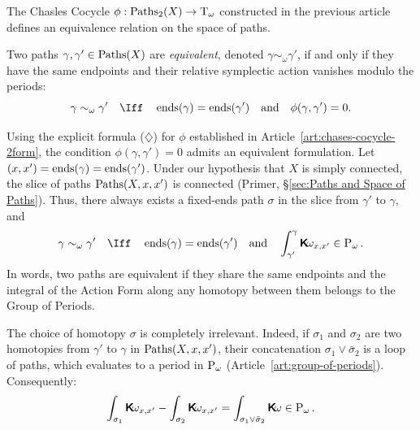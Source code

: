 \documentclass[10pt,reqno,letterpaper,twoside]{amsbook}
\begin{document}
  \begin{article}
    \label{art:equivalence-relation}
    The Chasles Cocycle $\phi: \operatorname{Paths}_2(X) \to \mathrm{T}_\omega$ constructed in the
    previous article defines an equivalence relation on the space of paths.
    
    \begin{definition}
      Two paths $\gamma, \gamma' \in \operatorname{Paths}(X)$ are \emph{equivalent},
      denoted $\gamma \sim_\omega \gamma'$,
      if and only if they have the same endpoints and their relative
      symplectic action vanishes modulo the periods:
      \[
        \gamma \sim_\omega \gamma'
        \qtext{\Iff}
        \EndsMap(\gamma) = \EndsMap(\gamma')
        \qtext{and}
        \phi(\gamma,\gamma') = 0.
        \]
    \end{definition}
    
    Using the explicit formula ($\diamondsuit$) for $\phi$ established in
    Article~\ref{art:chases-cocycle-2form},
    the condition $\phi(\gamma,\gamma') = 0$ admits an equivalent
    formulation.
    Let $(x,x') = \operatorname{ends}(\gamma) = \operatorname{ends}(\gamma')$.
    Under our hypothesis that $X$ is simply connected, the slice of paths
    $\operatorname{Paths}(X,x,x')$ is connected (Primer, \S\ref{sec:Paths and Space of Paths}).
    Thus, there always exists a fixed-ends path $\sigma$ in the slice
    from $\gamma'$ to $\gamma$, and
    \[
      \gamma \sim_\omega \gamma'
      \qtext{\Iff}
      \EndsMap(\gamma) = \EndsMap(\gamma')
      \qtext{and}
      \int_{\gamma'}^\gamma \Komega_{x,x'} \in \Pomega.
      \]
    In words,
    two paths are equivalent if they share the same endpoints
    and the integral of the Action Form along any homotopy between them
    belongs to the Group of Periods.
    
    The choice of homotopy $\sigma$ is completely irrelevant.
    Indeed, if $\sigma_1$ and $\sigma_2$ are two homotopies from $\gamma'$ to $\gamma$ in $\operatorname{Paths}(X,x,x')$,
    their concatenation $\sigma_1 \vee \bar{\sigma}_2$ is a loop of paths,
    which evaluates to a period in $\operatorname{P}_\omega$ (Article~\ref{art:group-of-periods}).
    Consequently:
    \[
      \int_{\sigma_1} \boldsymbol{\mathsf{K}}\!\omega_{x,x'} - \int_{\sigma_2} \boldsymbol{\mathsf{K}}\!\omega_{x,x'} = \int_{\sigma_1 \vee \bar{\sigma}_2} \boldsymbol{\mathsf{K}}\!\omega \in \operatorname{P}_\omega.
      \]
  \end{article}
  
\end{document}
